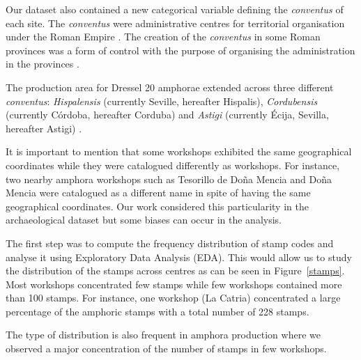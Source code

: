 \documentclass[review]{elsarticle}
\newcommand{\memo}[2]{\textcolor{#1}{#2}}
\newcommand{\maria}[1]{\memo{red}{MC: #1\\}}
\newcommand{\xavi}[1]{\memo{magenta}{XRC: #1\\}}
\begin{document}

Our dataset also contained a new categorical variable defining the \textit{conventus} of each site. The \textit{conventus} were administrative centres for territorial organisation under the Roman Empire \citep[58]{ozcariz_gil_administracion_2013}.
The creation of the \textit{conventus} in some Roman provinces was a form of control with the purpose of organising the administration in the provinces \citep{albertini_les_1923}.


The production area for Dressel 20 amphorae extended across three different \textit{conventus}: \textit{Hispalensis} (currently Seville, hereafter Hispalis), \textit{Cordubensis} (currently C\'ordoba, hereafter Corduba) and \textit{Astigi} (currently Écija, Sevilla, hereafter Astigi) \citep{rodriguez_economioleicola_1977,chicdatos2001,berni_millet_epigrafianforica_2008} . 


It is important to mention that some workshops exhibited the same geographical coordinates while they were catalogued differently as workshops. For instance, two nearby amphora workshops such as Tesorillo de Doña Mencia and Doña Mencia were catalogued as a different name in spite of having the same geographical coordinates. Our work considered this particularity in the archaeological dataset but some biases can occur in the analysis. 

The first step was to compute the frequency distribution of stamp codes and analyse it using Exploratory Data Analysis (EDA). This would allow us to study the distribution of the stamps across centres as can be seen in Figure~\ref{stamps}. Most workshops concentrated few stamps while few workshops contained more than 100 stamps. For instance, one workshop (La Catria) concentrated a large percentage of the amphoric stamps with a total number of 228 stamps.

The type of distribution is also frequent in amphora production where we observed a major concentration of the number of stamps in few workshops\citep{bayesian_2018,coto-sarmiento_identifying_2018}.


\end{document}
